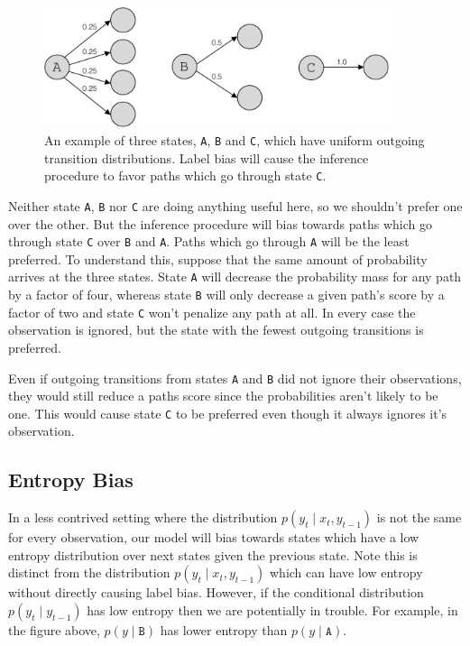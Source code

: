 \documentclass[11pt, letterpaper]{article}
\begin{document}
\begin{figure}
    \centering
    \includegraphics[width=0.9\textwidth]{figures/number_transitions.pdf}
    \caption{An example of three states, \texttt{A}, \texttt{B} and \texttt{C},
    which have uniform outgoing transition distributions. Label bias will cause
    the inference procedure to favor paths which go through state \texttt{C}.}
    \label{fig:trans}
\end{figure}

Neither state \texttt{A}, \texttt{B} nor \texttt{C} are doing anything useful
here, so we shouldn't prefer one over the other. But the inference procedure
will bias towards paths which go through state \texttt{C} over \texttt{B} and
\texttt{A}. Paths which go through \texttt{A} will be the least preferred. To
understand this, suppose that the same amount of probability arrives at the
three states. State \texttt{A} will decrease the probability mass for any path
by a factor of four, whereas state \texttt{B} will only decrease a given path's
score by a factor of two and state \texttt{C} won't penalize any path at all.
In every case the observation is ignored, but the state with the fewest
outgoing transitions is preferred.

Even if outgoing transitions from states \texttt{A} and \texttt{B} did not
ignore their observations, they would still reduce a paths score since the
probabilities aren't likely to be one. This would cause state \texttt{C} to be
preferred even though it always ignores it's observation.

\subsection{Entropy Bias}

In a less contrived setting where the distribution $p(y_t \mid x_t, y_{t-1})$
is not the same for every observation, our model will bias towards states which
have a low entropy distribution over next states given the previous state.
Note this is distinct from the distribution $p(y_t \mid x_t, y_{t-1})$ which
can have low entropy without directly causing label bias. However, if the
conditional distribution $p(y_t \mid y_{t-1})$ has low entropy then we are
potentially in trouble. For example, in the figure above, $p(y \mid
\texttt{B})$ has lower entropy than $p(y \mid \texttt{A})$.
\end{document}
